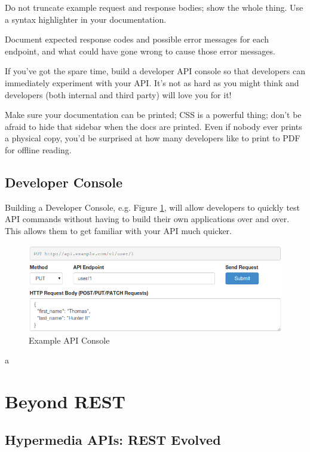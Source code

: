 \documentclass{book}
\begin{document}
Do not truncate example request and response bodies; show the whole thing. Use a syntax highlighter in your documentation.

Document expected response codes and possible error messages for each endpoint, and what could have gone wrong to cause those error messages.

If you've got the spare time, build a developer API console so that developers can immediately experiment with your API. It's not as hard as you might think and developers (both internal and third party) will love you for it!

Make sure your documentation can be printed; CSS is a powerful thing; don't be afraid to hide that sidebar when the docs are printed. Even if nobody ever prints a physical copy, you'd be surprised at how many developers like to print to PDF for offline reading.


\section{Developer Console}

Building a Developer Console, e.g. Figure \ref{fig:devconsole}, will allow developers to quickly test API commands without having to build their own applications over and over. This allows them to get familiar with your API much quicker.

\begin{figure}[ht!]
\centering
\includegraphics[width=120mm]{images/api-console.png}
\caption{Example API Console}
\label{fig:devconsole}
\end{figure}

a


\chapter{Beyond REST}

\section{Hypermedia APIs: REST Evolved}
\end{document}
